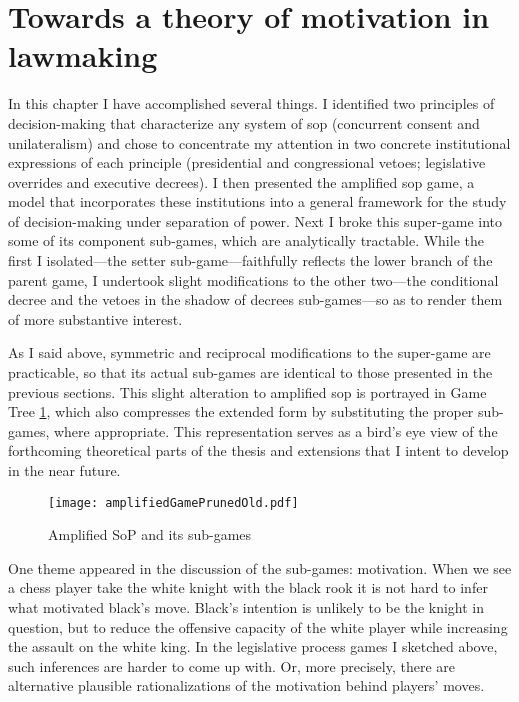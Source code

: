 \section{Towards a theory of motivation in lawmaking}

In this chapter I have accomplished several things.  I identified two principles of decision-making that characterize any system of sop (concurrent consent and unilateralism) and chose to concentrate my attention in two concrete institutional expressions of each principle (presidential and congressional vetoes; legislative overrides and executive decrees).  I then presented the amplified sop game, a model that incorporates these institutions into a general framework for the study of decision-making under separation of power.  Next I broke this super-game into some of its component sub-games, which are analytically tractable.  While the first I isolated---the setter sub-game---faithfully reflects the lower branch of the parent game, I undertook slight modifications to the other two---the conditional decree and the vetoes in the shadow of decrees sub-games---so as to render them of more substantive interest.  

As I said above, symmetric and reciprocal modifications to the super-game are practicable, so that its actual sub-games are identical to those presented in the previous sections.   This slight alteration to amplified sop is portrayed in Game Tree \ref{f:amplifiedGamePruned}, which also compresses the extended form by substituting the proper sub-games, where appropriate.  This representation serves as a bird's eye view of the forthcoming theoretical parts of the thesis and extensions that I intent to develop in the near future.  

\begin{figure}
 \begin{center}
  \texttt{[image: amplifiedGamePrunedOld.pdf]}
 \caption{Amplified SoP and its sub-games}\label{f:amplifiedGamePruned}
 \end{center}
\end{figure}

One theme appeared in the discussion of the sub-games: motivation.  When we see a chess player take the white knight with the black rook it is not hard to infer what motivated black's move.  Black's intention is unlikely to be the knight in question, but to reduce the offensive capacity of the white player while increasing the assault on the white king.  In the legislative process games I sketched above, such inferences are harder to come up with.  Or, more precisely, there are alternative plausible rationalizations of the motivation behind players' moves.  

